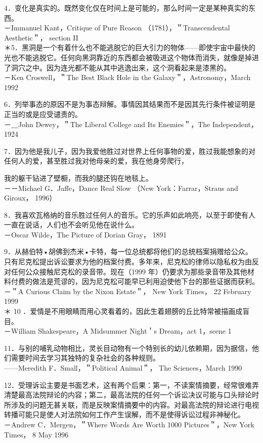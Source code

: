 4．变化是真实的。既然变化仅在时间上是可能的，那么时间一定是某种真实的东西。\\
－Immanuel Kant，Critique of Pure Reason （1781），＂Transcendental Aesthetic＂， section II\\
＊5．黑洞是一个有着什么也不能逃脱它的巨大引力的物体——即使宇宙中最快的光也不能逃脱它。任何向黑洞靠近的东西都会被吸进这个物体而消失，就像是掉进了洞穴之中。因为连光都不能从其中逃逸出来，这个洞看起来是漆黑的。\\
－Ken Croswell，＂The Best Black Hole in the Galaxy＂，Astronomy，March 1992

6．列举事态的原因不是为事态辩解。事情因其结果而不是因其先行条件被证明是正当的或是应受谴责的。\\
－＿John Dewey，＂The Liberal College and Its Enemies＂，The Independent， 1924

7．因为他是我儿子，因为我爱他胜过对世界上任何事物的爱，胜过我能想象的对任何人的爱，甚至胜过我对他母亲的爱，我在他身旁爬行，

我的躯干钻进了壁橱，而我的腿还钩在地毯上。\\
－－Michael G．Jaffe，Dance Real Slow （New York：Farrar，Straus and Giroux， 1996）

8．我喜欢瓦格纳的音乐胜过任何人的音乐。它的乐声如此响亮，以至于即使有人一直在说话，人们也不会听见他在说什么。\\
－Oscar Wilde，The Picture of Dorian Gray， 1891

9．从赫伯特•胡佛到杰米•卡特，每一位总统都将他们的总统档案捐赠给公众。只有尼克松提出诉讼要求为他的档案付费。多年来，尼克松的律师以隐私权为由反对任何公众接触尼克松的录音带。现在（1999 年）仍要求为那些录音带及其他材料付费的做法是荒谬的，因为尼克松可能早已利用迫使他下台的那些证据而获利。\\
－＂A Curious Claim by the Nixon Estate＂， New York Times， 22 February 1999\\
＊ 10 ．爱情是不用眼睛而用心灵看着的，因此生着翅膀的丘比特常被描画成盲目。\\
－William Shakespeare，A Midsummer Night＇s Dream，act 1，scene 1

11．与别的哺乳动物相比，灵长目动物有一个特别长的幼儿依赖期，因为据信，他们需要时间去学习其独特的复杂社会的各种规则。\\
——Meredith F．Small，＂Political Animal＂， The Sciences，March 1990

12．受理诉讼主要是书面艺术，这有两个后果：第一，不读案情摘要，经常很难弄清楚最高法院辩论的内容；第二，最高法院的任何一个诉讼决议可能与口头辩论时所涉及的问题无甚关联，而是反映案情摘要中的内容。对最高法院的辩论进行电视转播可能只是使人对法院如何工作产生误解，而不是使得诉讼过程非神秘化。\\
－Andrew C．Mergen，＂Where Words Are Worth 1000 Pictures＂，New York Times， 8 May 1996


